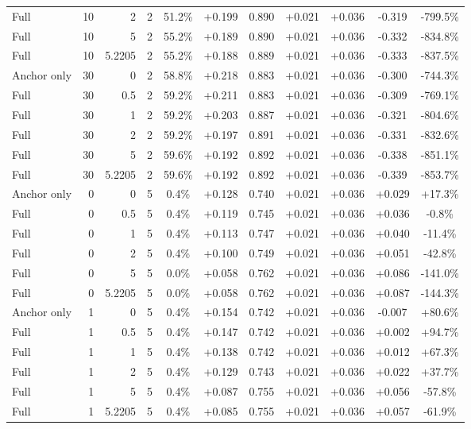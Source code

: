 \begin{table}[htbp]
\begin{tabular}{lrrrccccccc}
Full & 10 & 2 & 2 & 51.2\% & +0.199 & 0.890 & +0.021 & +0.036 & -0.319 & -799.5\% \\
Full & 10 & 5 & 2 & 55.2\% & +0.189 & 0.890 & +0.021 & +0.036 & -0.332 & -834.8\% \\
Full & 10 & 5.2205 & 2 & 55.2\% & +0.188 & 0.889 & +0.021 & +0.036 & -0.333 & -837.5\% \\
Anchor only & 30 & 0 & 2 & 58.8\% & +0.218 & 0.883 & +0.021 & +0.036 & -0.300 & -744.3\% \\
Full & 30 & 0.5 & 2 & 59.2\% & +0.211 & 0.883 & +0.021 & +0.036 & -0.309 & -769.1\% \\
Full & 30 & 1 & 2 & 59.2\% & +0.203 & 0.887 & +0.021 & +0.036 & -0.321 & -804.6\% \\
Full & 30 & 2 & 2 & 59.2\% & +0.197 & 0.891 & +0.021 & +0.036 & -0.331 & -832.6\% \\
Full & 30 & 5 & 2 & 59.6\% & +0.192 & 0.892 & +0.021 & +0.036 & -0.338 & -851.1\% \\
Full & 30 & 5.2205 & 2 & 59.6\% & +0.192 & 0.892 & +0.021 & +0.036 & -0.339 & -853.7\% \\
Anchor only & 0 & 0 & 5 & 0.4\% & +0.128 & 0.740 & +0.021 & +0.036 & +0.029 & +17.3\% \\
Full & 0 & 0.5 & 5 & 0.4\% & +0.119 & 0.745 & +0.021 & +0.036 & +0.036 & -0.8\% \\
Full & 0 & 1 & 5 & 0.4\% & +0.113 & 0.747 & +0.021 & +0.036 & +0.040 & -11.4\% \\
Full & 0 & 2 & 5 & 0.4\% & +0.100 & 0.749 & +0.021 & +0.036 & +0.051 & -42.8\% \\
Full & 0 & 5 & 5 & 0.0\% & +0.058 & 0.762 & +0.021 & +0.036 & +0.086 & -141.0\% \\
Full & 0 & 5.2205 & 5 & 0.0\% & +0.058 & 0.762 & +0.021 & +0.036 & +0.087 & -144.3\% \\
Anchor only & 1 & 0 & 5 & 0.4\% & +0.154 & 0.742 & +0.021 & +0.036 & -0.007 & +80.6\% \\
Full & 1 & 0.5 & 5 & 0.4\% & +0.147 & 0.742 & +0.021 & +0.036 & +0.002 & +94.7\% \\
Full & 1 & 1 & 5 & 0.4\% & +0.138 & 0.742 & +0.021 & +0.036 & +0.012 & +67.3\% \\
Full & 1 & 2 & 5 & 0.4\% & +0.129 & 0.743 & +0.021 & +0.036 & +0.022 & +37.7\% \\
Full & 1 & 5 & 5 & 0.4\% & +0.087 & 0.755 & +0.021 & +0.036 & +0.056 & -57.8\% \\
Full & 1 & 5.2205 & 5 & 0.4\% & +0.085 & 0.755 & +0.021 & +0.036 & +0.057 & -61.9\% \\

\end{tabular}
\end{table}
